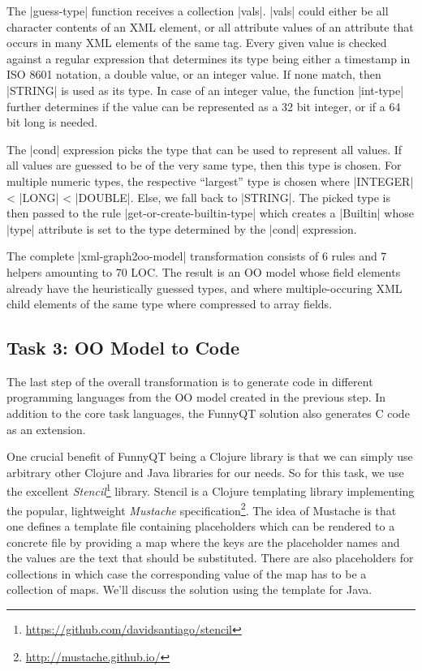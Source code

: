 \documentclass[submission]{eptcs}
\newcommand{\code}{\clojureinline}
\begin{document}
The \code|guess-type| function receives a collection \code|vals|.  \code|vals|
could either be all character contents of an XML element, or all attribute
values of an attribute that occurs in many XML elements of the same tag.  Every
given value is checked against a regular expression that determines its type
being either a timestamp in ISO 8601 notation, a double value, or an integer
value.  If none match, then \code|STRING| is used as its type.  In case of an
integer value, the function \code|int-type| further determines if the value can
be represented as a 32 bit integer, or if a 64 bit long is needed.

The \code|cond| expression picks the type that can be used to represent all
values.  If all values are guessed to be of the very same type, then this type
is chosen.  For multiple numeric types, the respective ``largest'' type is
chosen where \code|INTEGER| < \code|LONG| < \code|DOUBLE|.  Else, we fall back
to \code|STRING|.  The picked type is then passed to the rule
\code|get-or-create-builtin-type| which creates a \code|Builtin| whose
\code|type| attribute is set to the type determined by the \code|cond|
expression.

The complete \code|xml-graph2oo-model| transformation consists of 6 rules and 7
helpers amounting to 70 LOC.  The result is an OO model whose field elements
already have the heuristically guessed types, and where multiple-occuring XML
child elements of the same type where compressed to array fields.


\subsection{Task 3: OO Model to Code}
\label{sec:oo-model-to-code}

The last step of the overall transformation is to generate code in different
programming languages from the OO model created in the previous step.  In
addition to the core task languages, the FunnyQT solution also generates C code
as an extension.

One crucial benefit of FunnyQT being a Clojure library is that we can simply
use arbitrary other Clojure and Java libraries for our needs.  So for this
task, we use the excellent
\emph{Stencil}\footnote{\url{https://github.com/davidsantiago/stencil}}
library.  Stencil is a Clojure templating library implementing the popular,
lightweight \emph{Mustache}
specification\footnote{\url{http://mustache.github.io/}}.  The idea of Mustache
is that one defines a template file containing placeholders which can be
rendered to a concrete file by providing a map where the keys are the
placeholder names and the values are the text that should be substituted.
There are also placeholders for collections in which case the corresponding
value of the map has to be a collection of maps.  We'll discuss the solution
using the template for Java.
\end{document}
